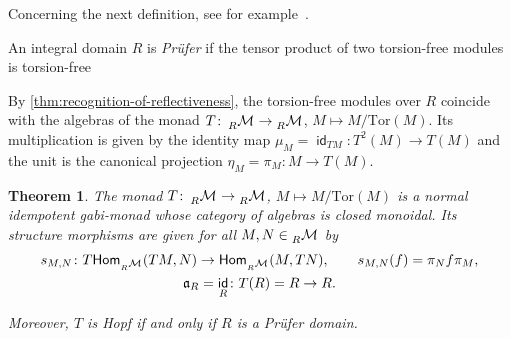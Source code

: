 \documentclass[12pt,dvipsnames,oneside]{amsart}
\theoremstyle{plain}
\newtheorem{theorem}[proposition]{Theorem}
\theoremstyle{remark}
\theoremstyle{definition}
\DeclareMathOperator{\id}{\mathsf{id}}
\newcommand*{\from}{\colon}
\newcommand{\Tor}{\ensuremath{\mathrm{Tor}}}
\newcommand{\act}{\mathfrak{a}}
\newcommand*{\Hom}{\mathsf{Hom}}
\begin{document}
Concerning the next definition, see for example~\cite[Theorem~4.2]{chase61:direc}.

\begin{definition}\label{def:Prufer-domain}
  An integral domain \(R\) is \emph{Pr\"ufer} if the tensor product of two torsion-free modules is torsion-free
\end{definition}

By \cref{thm:recognition-of-reflectiveness}, the torsion-free modules over \(R\) coincide with the algebras of the monad \(T\from \hmodM[R] \to \hmodM[R]\), \(M\mapsto M/\Tor(M)\).
Its multiplication is given by the identity map \(\mu_{M}=\id_{TM} \from T^{2}(M)\to T(M)\) and the unit is the canonical projection \(\eta_{M} = \pi_{M} \from M \to T(M)\).

\begin{theorem}\label{thm:normal-gaby-monad-torsion}
  The monad \(T\from \hmodM[R] \to \hmodM[R]\), \(M\mapsto M/\Tor(M)\) is a normal idempotent gabi-monad whose category of algebras is closed monoidal.
  Its structure morphisms are given for all \(M, N \in\hmodM[R]\) by
  \begin{equation}\label{eq:structure-morphisms-pruefer-example}
    \begin{gathered}
      s_{M,N} \from T \Hom_{\hmodM[R]}(TM,N) \to \Hom_{\hmodM[R]}(M,TN), \qquad s_{M,N}(f) = \pi_{N}f \pi_{M}, \\
      \act_{R} = \id_{R} \from T(R) = R \to R.
    \end{gathered}
  \end{equation}

  Moreover, \(T\) is Hopf if and only if \(R\) is a Pr\"ufer domain.
\end{theorem}
\end{document}
